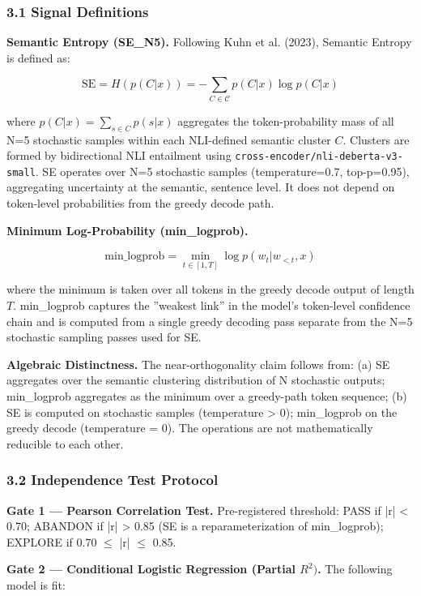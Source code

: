 
\subsubsection{3.1 Signal Definitions}

\textbf{Semantic Entropy (SE\_N5).} Following Kuhn et al. (2023), Semantic Entropy is defined as:

$$\text{SE} = H(p(C|x)) = -\sum_{C \in \mathcal{C}} p(C|x) \log p(C|x)$$

where $p(C|x) = \sum_{s \in C} p(s|x)$ aggregates the token-probability mass of all N=5 stochastic samples within each NLI-defined semantic cluster $C$. Clusters are formed by bidirectional NLI entailment using \texttt{cross-encoder/nli-deberta-v3-small}. SE operates over N=5 stochastic samples (temperature=0.7, top-p=0.95), aggregating uncertainty at the semantic, sentence level. It does not depend on token-level probabilities from the greedy decode path.

\textbf{Minimum Log-Probability (min\_logprob).}

$$\text{min\_logprob} = \min_{t \in [1,T]} \log p(w_t | w_{<t}, x)$$

where the minimum is taken over all tokens in the greedy decode output of length $T$. min\_logprob captures the ''weakest link'' in the model's token-level confidence chain and is computed from a single greedy decoding pass separate from the N=5 stochastic sampling passes used for SE.

\textbf{Algebraic Distinctness.} The near-orthogonality claim follows from: (a) SE aggregates over the semantic clustering distribution of N stochastic outputs; min\_logprob aggregates as the minimum over a greedy-path token sequence; (b) SE is computed on stochastic samples (temperature > 0); min\_logprob on the greedy decode (temperature = 0). The operations are not mathematically reducible to each other.

\subsubsection{3.2 Independence Test Protocol}

\textbf{Gate 1 --- Pearson Correlation Test.} Pre-registered threshold: PASS if |r| < 0.70; ABANDON if |r| > 0.85 (SE is a reparameterization of min\_logprob); EXPLORE if 0.70 $\leq$ |r| $\leq$ 0.85.

\textbf{Gate 2 --- Conditional Logistic Regression (Partial $R^{2})$.} The following model is fit:

